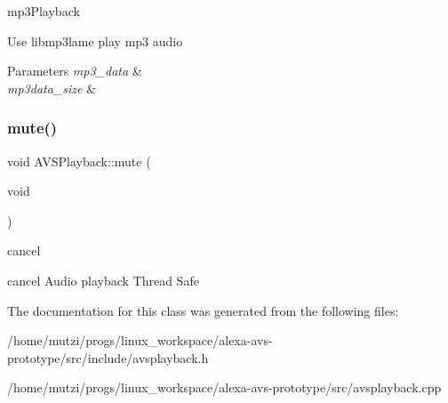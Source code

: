 mp3\+Playback 

Use libmp3lame play mp3 audio


\begin{DoxyParams}{Parameters}
{\em mp3\+\_\+data} & \\
\hline
{\em mp3data\+\_\+size} & \\
\hline
\end{DoxyParams}
\mbox{\label{classAVSPlayback_a2460eb0d8552541d3cc44fde4156147e}} 
\subsubsection{\texorpdfstring{mute()}{mute()}}
{\footnotesize\ttfamily void A\+V\+S\+Playback\+::mute (\begin{DoxyParamCaption}\item[{void}]{ }\end{DoxyParamCaption})}



cancel 

cancel Audio playback Thread Safe 

The documentation for this class was generated from the following files\+:\begin{DoxyCompactItemize}
\item 
/home/mutzi/progs/linux\+\_\+workspace/alexa-\/avs-\/prototype/src/include/avsplayback.\+h\item 
/home/mutzi/progs/linux\+\_\+workspace/alexa-\/avs-\/prototype/src/avsplayback.\+cpp\end{DoxyCompactItemize}
